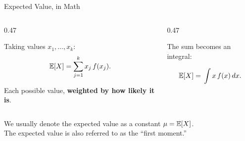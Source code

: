 \documentclass[9pt,english,aspectratio=169]{beamer}
\begin{document}
\begin{frame}{Expected Value, in Math}

  \vspace{0.9em}
  {
  \begin{columns}[T]
    \begin{column}{0.47\textwidth}
      \begin{definitionbox}[Discrete $X$]
        Taking values $x_1, \ldots, x_k$:
        \[
          \mathbb{E}[X] = \sum_{j=1}^{k} x_j\, f(x_j).
        \]
      \end{definitionbox}
      Each possible value, \textbf{weighted by how likely it is}.

    \end{column}
    \pause
    \begin{column}{0.47\textwidth}
      \begin{definitionbox}[Continuous $X$]
        The sum becomes an integral:
        \[
          \E[X] = \vphantom{\sum_{j=1}^{k}} \int x\, f(x)\, dx.
        \]
      \end{definitionbox}
    \end{column}
  \end{columns}}
  \pause 
  \vspace{2em}

  \begin{insightbox}
      We usually denote the expected value as a constant $\mu = \mathbb{E}[X]$. \\

      The expected value is also referred to as the ``first moment.''
  \end{insightbox}

\end{frame}
\end{document}
